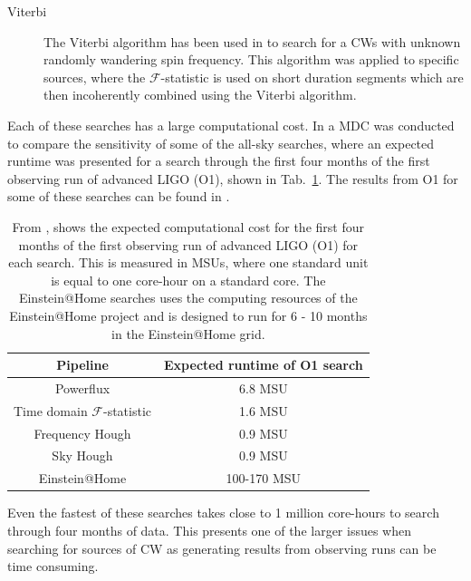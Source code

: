 \begin{description}
        \item[Viterbi] The Viterbi algorithm \citep{viterbi1967ErrorBounds} has
been used in \citep{sun2018HiddenMarkov,
suvorova2017HiddenMarkov,abbott2017SearchGravitational,
abbott2018SearchGravitational, sun2018ApplicationHidden} to search for a
\glspl{CW} with unknown randomly wandering spin frequency. This
algorithm was applied to specific sources, where the $\mathcal{F}$-statistic is
used on short duration segments which are then incoherently combined using the
Viterbi algorithm.
	
\end{description}

Each of these searches has a large computational cost. In \citep{walsh2016ComparisonMethods} a
\gls{MDC} was conducted to compare the sensitivity of some of the all-sky 
searches, where an expected runtime was presented for a search through the first four months of the first observing run of advanced \gls{LIGO} (O1), shown in Tab.~\ref{searchcw:search:semi:cost}. 
The results from O1 for some of these searches can be found in \citep{ligoscientificcollaborationandvirgocollaboration2017AllskySearch}.  
%
\begin{table}
	\centering
        \caption[Computational cost of \gls{CW} searches.]{From
\citep{walsh2016ComparisonMethods}, shows the expected computational cost for the first
four months of the first observing run of advanced \gls{LIGO} (O1) for each search. This is measured in \glspl{MSU}, where one
standard unit is equal to one core-hour on a standard core.
The Einstein@Home searches uses the computing resources
of the Einstein@Home project and is designed to run for 6 - 10 months in the
Einstein@Home grid.
  \label{searchcw:search:semi:cost}}
	
        \bgroup {} \centering \begin{tabular}{|c c|} \hline
Pipeline & Expected runtime of O1 search \\ \hline Powerflux & 6.8 MSU \\

		Time domain $\mathcal{F}$-statistic & 1.6 MSU\\

		Frequency Hough & 0.9 MSU \\

		Sky Hough & 0.9 MSU\\
		\hline
		Einstein@Home & 100-170 MSU\\
		\hline

	\end{tabular}
	\egroup
\end{table}
%
Even the fastest of these searches takes close to 1 million core-hours to
search through four months of data. 
This presents one of the larger issues when searching for sources of \gls{CW} as generating results from observing runs can be time consuming. 



